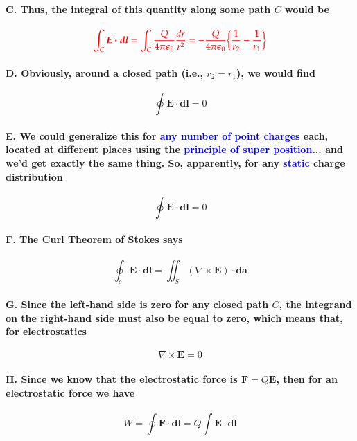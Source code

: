 \documentclass{article}
\begin{document}
\paragraph{C. Thus, the integral of this quantity along some path $C$ would be}
\begin{equation*}
    \textcolor{red}{\int_C \boldsymbol{E\cdot dl}=\int_C \frac{Q}{4\pi \epsilon_0}\frac{dr}{r^2}=-\frac{Q}{4\pi \epsilon_0}\bigg\{ \frac{1}{r_2}-\frac{1}{r_1}\bigg\}}
\end{equation*}
\paragraph{D. Obviously, around a closed path (i.e., $r_2=r_1$), we would find}
\begin{equation*}
    \oint\boldsymbol{E\cdot dl}=0
\end{equation*}
\paragraph{E. We could generalize this for \textcolor{blue}{any number of point charges} each, located at different places using the \textcolor{blue}{principle of super position}...  and we'd get exactly the same thing. So, apparently, for any \textcolor{blue}{static} charge distribution}
\begin{equation*}
    \oint\boldsymbol{E\cdot dl}=0
\end{equation*}
\paragraph{F. The Curl Theorem of Stokes says}
\begin{equation*}
    \oint_c\boldsymbol{E\cdot dl}=\iint_S (\nabla \times \boldsymbol{E})\cdot \boldsymbol{da}
\end{equation*}
\paragraph{G. Since the left-hand side is zero for any closed path $C$, the integrand on the right-hand side must also be equal to zero, which means that, for electrostatics}
\begin{equation*}
    \nabla \times \boldsymbol{E}=0
\end{equation*}
\paragraph{H. Since we know that the electrostatic force is $\boldsymbol{F}=Q\boldsymbol{E}$, then for an electrostatic force we have}
\begin{equation*}
    W=\oint \boldsymbol{F\cdot dl}=Q\int\boldsymbol{E\cdot dl}
\end{equation*}
\end{document}
